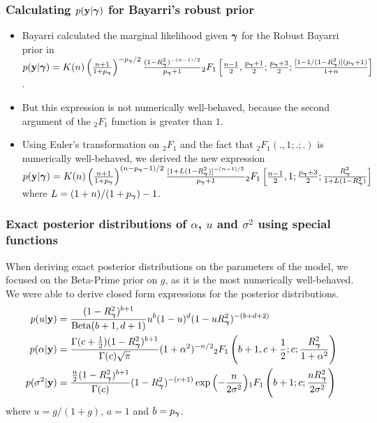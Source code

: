 \documentclass{beamer}
\begin{document}
\begin{frame}
	\frametitle{Calculating $p({\bf y} | {\boldsymbol \gamma})$ for Bayarri's robust prior}
	\begin{itemize}
		\item Bayarri calculated the marginal likelihood given ${\boldsymbol \gamma}$ for the Robust Bayarri prior
		 	in \cite{Bayarri2012} 
			\tiny
			$p({\bf y} | {\boldsymbol \gamma}) = K(n) \left(\frac{n + 1}{1 + p_{\boldsymbol \gamma}}\right)^{-p_{\boldsymbol \gamma}/2} \frac{(1 - R^2_{\boldsymbol \gamma})^{-(n-1)/2}}{p_{\boldsymbol \gamma} + 1} {}_2 F_1 \left[ \frac{n-1}{2}, \frac{p_{\boldsymbol \gamma}+1}{2}; \frac{p_{\boldsymbol \gamma} + 3}{2}; \frac{[1 - 1/(1 - R^2_{\boldsymbol \gamma})](p_{\boldsymbol \gamma} + 1)}{1 + n} \right]$.
		\small
		\item But this expression is not numerically well-behaved, because the second argument of the
					${}_2 F_1$ function is greater than $1$.
		\item Using Euler's transformation on ${}_2 F_1$ and the fact that ${}_2 F_1(., 1; .; .)$ is numerically
					well-behaved, we derived the new expression
			\tiny
			$p({\bf y} | {\boldsymbol \gamma}) = K(n) \left(\frac{n + 1}{1 + p_{\boldsymbol \gamma}}\right)^{(n-p_{\boldsymbol \gamma}-1)/2} \frac{[1 + L (1 - R^2_{\boldsymbol \gamma})]^{-(n-1)/2}}{p_{\boldsymbol \gamma} + 1} {}_2 F_1 \left[ \frac{n-1}{2}, 1; \frac{p_{\boldsymbol \gamma} + 3}{2}; 
			\frac{R^2_{\boldsymbol \gamma}}{1 + L(1 - R^2_{\boldsymbol \gamma})} \right]$ \\
			\small
			where $L = (1 + n)/(1 + p_{\boldsymbol \gamma}) - 1$.

	\end{itemize}
\end{frame}

\begin{frame}
	\frametitle{Exact posterior distributions of $\alpha$, $u$ and $\sigma^2$ using special functions}
	When deriving exact posterior distributions on the parameters of the model,
	we focused on the Beta-Prime prior on $g$, as it is the most numerically well-behaved. \\
	We were able to derive closed form expressions for the posterior distributions.
	\small
	\begin{align*}
		p(u | {\bf y}) &= \frac{(1 - R_{\boldsymbol \gamma}^2)^{b + 1}}{\text{Beta}(b + 1, d + 1)} u^b (1 - u)^d (1 - u R_{\boldsymbol \gamma}^2)^{-(b + d + 2)} \\
		p(\alpha | {\bf y}) &= \frac{\Gamma(c + \frac{1}{2}) (1 - R_{\boldsymbol \gamma}^2)^{b + 1}}{\Gamma(c) \sqrt{\pi}} (1 + \alpha^2)^{-n/2}
		{}_2 F_1 \left(b + 1, c + \frac{1}{2}; c; \frac{R_{\boldsymbol \gamma}^2}{1 + \alpha^2}\right) \\
		p(\sigma^2 | {\bf y}) &= \frac{\frac{n}{2} (1 - R_{\boldsymbol \gamma}^2)^{b + 1}}{\Gamma(c)} (1 - R_{\boldsymbol \gamma}^2)^{-(c + 1)}
												\exp{\left( -\frac{n}{2 \sigma^2} \right)} {}_1 F_1 \left(b + 1; c; \frac{n R_{\boldsymbol \gamma}^2}{2 \sigma^2}\right)
	\end{align*}
	where $u = g/(1 + g)$, $a = 1$ and $b = p_{\boldsymbol \gamma}$.
\end{frame}
\end{document}
